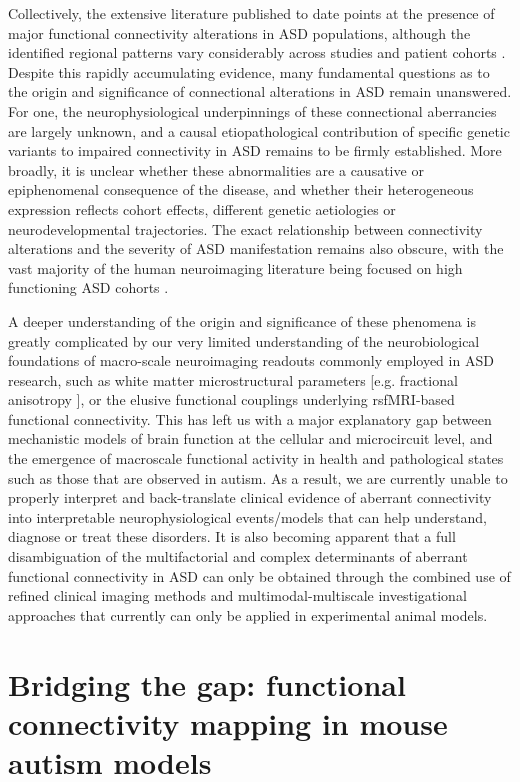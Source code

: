 Collectively, the extensive literature published to date points at the presence
of major functional connectivity alterations in ASD populations, although the
identified regional patterns vary considerably across studies and patient
cohorts \parencite{ameis2015, bernhardt2016, ecker2014, ecker2015, kana2011,
muller2014, vasa2016}. Despite this rapidly accumulating evidence, many
fundamental questions as to the origin and significance of connectional
alterations in ASD remain unanswered. For one, the neurophysiological
underpinnings of these connectional aberrancies are largely unknown, and a
causal etiopathological contribution of specific genetic variants to impaired
connectivity in ASD remains to be firmly established. More broadly, it is
unclear whether these abnormalities are a causative or epiphenomenal consequence
of the disease, and whether their heterogeneous expression reflects cohort
effects, different genetic aetiologies or neurodevelopmental trajectories. The
exact relationship between connectivity alterations and the severity of ASD
manifestation remains also obscure, with the vast majority of the human
neuroimaging literature being focused on high functioning ASD cohorts
\parencite{vissers2012}. 

A deeper understanding of the origin and significance of these phenomena is
greatly complicated by our very limited understanding of the neurobiological
foundations of macro-scale neuroimaging readouts commonly employed in ASD
research, such as white matter microstructural parameters [e.g. fractional
anisotropy \parencite{owen2014}], or the elusive functional couplings underlying
rsfMRI-based functional connectivity. This has left us with a major explanatory
gap between mechanistic models of brain function at the cellular and
microcircuit level, and the emergence of macroscale functional activity in
health and pathological states such as those that are observed in autism. As a
result, we are currently unable to properly interpret and back-translate
clinical evidence of aberrant connectivity into interpretable neurophysiological
events/models that can help understand, diagnose or treat these disorders. It is
also becoming apparent that a full disambiguation of the multifactorial and
complex determinants of aberrant functional connectivity in ASD can only be
obtained through the combined use of refined clinical imaging methods and
multimodal-multiscale investigational approaches that currently can only be
applied in experimental animal models.

\section{Bridging the gap: functional connectivity mapping in mouse autism
models}

